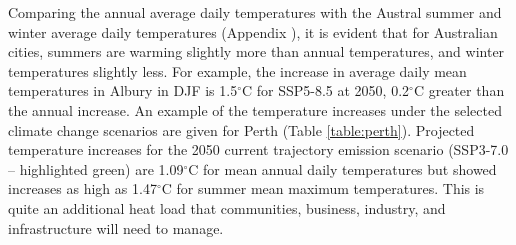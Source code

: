 \documentclass[utf8]{frontiersSCNS} %
\begin{document}
Comparing the annual average daily temperatures with the Austral summer and winter average daily temperatures (Appendix \label{section:appendix2}), it is evident that for Australian cities, summers are warming slightly more than annual temperatures, and winter temperatures slightly less.  For example, the increase in average daily mean temperatures in Albury in DJF is 1.5$^{\circ}$C for SSP5-8.5 at 2050, 0.2$^{\circ}$C greater than the annual increase. An example of the temperature increases under the selected climate change scenarios are given for Perth (Table \ref{table:perth}). Projected temperature increases for the 2050 current trajectory emission scenario (SSP3-7.0 – highlighted green) are 1.09$^{\circ}$C for mean annual daily temperatures but showed increases as high as 1.47$^{\circ}$C for summer mean maximum temperatures. This is quite an additional heat load that communities, business, industry, and infrastructure will need to manage.
\end{document}
